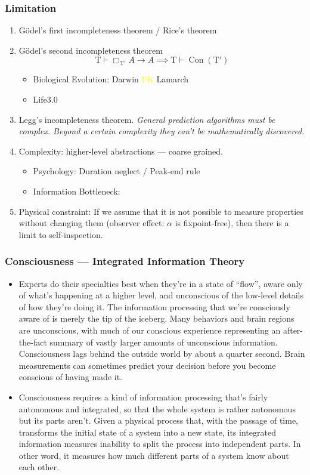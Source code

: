 \documentclass[UTF8,11pt,colorlinks,compress,openany]{beamer}%
\begin{document}
\begin{frame}\frametitle{Limitation}
\begin{enumerate}
	\item G\"odel's first incompleteness theorem / Rice's theorem
	\item G\"odel's second incompleteness theorem
	\[\mathrm{T}\vdash\Box_{\mathrm{T}'}A\to A\implies \mathrm{T}\vdash\operatorname{Con}(\mathrm{T}')\]
	\begin{itemize}
		\item Biological Evolution: Darwin \textcolor{yellow}{PK} Lamarch
		\item Life3.0
	\end{itemize}
	\item Legg's incompleteness theorem. \emph{General prediction algorithms must be complex. Beyond a certain complexity they can't be mathematically discovered.}
	\item Complexity: higher-level abstractions --- coarse grained.\\
	\begin{itemize}
		\item Psychology: Duration neglect / Peak-end rule
		\item Information Bottleneck: 
	\end{itemize}
	\item Physical constraint: If we assume that it is not possible to measure properties without changing them (observer effect: $\alpha$ is fixpoint-free), then there is a limit to self-inspection.
\end{enumerate}
\end{frame}

\begin{frame}\frametitle{Consciousness --- Integrated Information Theory}
\begin{itemize}
	\item Experts do their specialties best when they're in a state of ``flow'', aware only of what's happening at a higher level, and unconscious of the low-level details of how they're doing it. The information processing that we're consciously aware of is merely the tip of the iceberg. Many behaviors and brain regions are unconscious, with much of our conscious experience representing an after-the-fact summary of vastly larger amounts of unconscious information. Consciousness lags behind the outside world by about a quarter second. Brain measurements can sometimes predict your decision before you become conscious of having made it.
	\item Consciousness requires a kind of information processing that's fairly autonomous and integrated, so that the whole system is rather autonomous but its parts aren't. Given a physical process that, with the passage of time, transforms the initial state of a system into a new state, its integrated information measures inability to split the process into independent parts. In other word, it measures how much different parts of a system know about each other.
\end{itemize}
\end{frame}
\end{document}
